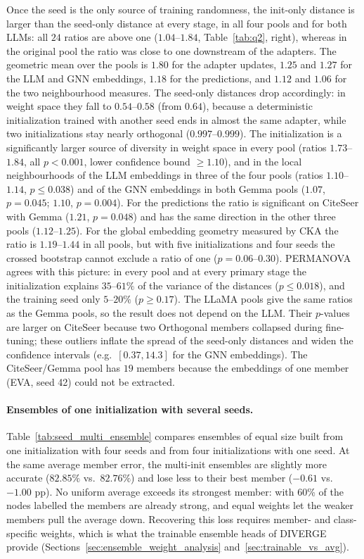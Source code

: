 \documentclass[a4paper,fleqn]{cas-sc}
\DeclareRobustCommand{\revcommon}[2][]{\textcolor{revshared}{#2}} %
\begin{document}
\revcommon[R1,R2,R4]{Once the seed is the only source of training randomness, the init-only distance is larger than the seed-only distance at every stage, in all four pools and for both LLMs: all $24$ ratios are above one ($1.04$--$1.84$, Table~\ref{tab:q2}, right), whereas in the original pool the ratio was close to one downstream of the adapters. The geometric mean over the pools is $1.80$ for the adapter updates, $1.25$ and $1.27$ for the LLM and GNN embeddings, $1.18$ for the predictions, and $1.12$ and $1.06$ for the two neighbourhood measures. The seed-only distances drop accordingly: in weight space they fall to $0.54$--$0.58$ (from $0.64$), because a deterministic initialization trained with another seed ends in almost the same adapter, while two initializations stay nearly orthogonal ($0.997$--$0.999$). The initialization is a significantly larger source of diversity in weight space in every pool (ratios $1.73$--$1.84$, all $p<0.001$, lower confidence bound $\geq1.10$), and in the local neighbourhoods of the LLM embeddings in three of the four pools (ratios $1.10$--$1.14$, $p\leq0.038$) and of the GNN embeddings in both Gemma pools ($1.07$, $p=0.045$; $1.10$, $p=0.004$). For the predictions the ratio is significant on CiteSeer with Gemma ($1.21$, $p=0.048$) and has the same direction in the other three pools ($1.12$--$1.25$). For the global embedding geometry measured by CKA the ratio is $1.19$--$1.44$ in all pools, but with five initializations and four seeds the crossed bootstrap cannot exclude a ratio of one ($p=0.06$--$0.30$). PERMANOVA agrees with this picture: in every pool and at every primary stage the initialization explains $35$--$61\%$ of the variance of the distances ($p\leq0.018$), and the training seed only $5$--$20\%$ ($p\geq0.17$). The LLaMA pools give the same ratios as the Gemma pools, so the result does not depend on the LLM. Their $p$-values are larger on CiteSeer because two Orthogonal members collapsed during fine-tuning; these outliers inflate the spread of the seed-only distances and widen the confidence intervals (e.g.\ $[0.37, 14.3]$ for the GNN embeddings). The CiteSeer/Gemma pool has $19$ members because the embeddings of one member (EVA, seed 42) could not be extracted.}

\paragraph{\revcommon{Ensembles of one initialization with several seeds.}}
\revcommon[R1,R2,R4]{Table~\ref{tab:seed_multi_ensemble} compares ensembles of equal size built from one initialization with four seeds and from four initializations with one seed. At the same average member error, the multi-init ensembles are slightly more accurate ($82.85\%$ vs.\ $82.76\%$) and lose less to their best member ($-0.61$ vs.\ $-1.00$ pp). No uniform average exceeds its strongest member: with 60\% of the nodes labelled the members are already strong, and equal weights let the weaker members pull the average down. Recovering this loss requires member- and class-specific weights, which is what the trainable ensemble heads of DIVERGE provide (Sections~\ref{sec:ensemble_weight_analysis} and~\ref{sec:trainable_vs_avg}).}
\end{document}
